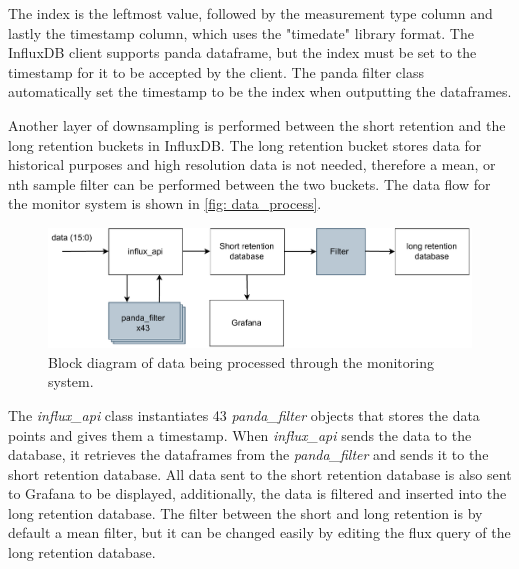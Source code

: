 \documentclass[main.tex]{subfiles}
\begin{document}
The index is the leftmost value, followed by the measurement type column and lastly the timestamp column, which uses the "timedate" library format. The InfluxDB client supports panda dataframe, but the index must be set to the timestamp for it to be accepted by the client. The panda filter class automatically set the timestamp to be the index when outputting the dataframes.

Another layer of downsampling is performed between the short retention and the long retention buckets in InfluxDB. The long retention bucket stores data for historical purposes and high resolution data is not needed, therefore a mean, or nth sample filter can be performed between the two buckets. The data flow for the monitor system is shown in \autoref{fig: data_process}.

 \begin{figure}[!htpb]
    \centering
    \includegraphics[width=18cm, scale=1]{images/processing data overview.pdf}
    \caption{Block diagram of data being processed through the monitoring system.}
    \label{fig: data_process}
\end{figure}
\FloatBarrier 

The \textit{influx\_api} class instantiates 43 \textit{panda\_filter} objects that stores the data points and gives them a timestamp. When \textit{influx\_api} sends the data to the database, it retrieves the dataframes from the \textit{panda\_filter} and sends it to the short retention database. All data sent to the short retention database is also sent to Grafana to be displayed, additionally, the data is filtered and inserted into the long retention database. The filter between the short and long retention is by default a mean filter, but it can be changed easily by editing the flux query of the long retention database.

 

 
\end{document}
